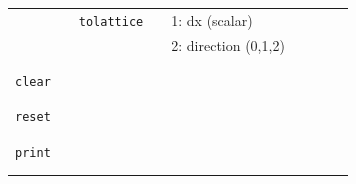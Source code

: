 \documentclass[11pt]{article}
\begin{document}
\begin{center}
\begin{tabular}{cclclclll}
    $\mbox{}$   && \verb!tolattice! && 1: dx (scalar) && \\
    $\mbox{}$   &&             && 2: direction (0,1,2) && \\
                                   && && && \\
    \hline
                                   && && && \\
    \verb!clear! & & && && \\
                                   && && && \\
    \hline
                                   && && && \\
    \verb!reset! & & && && \\
                                   && && && \\
    \hline
                                   && && && \\
   \verb!print! & & && && \\
                                   && && && \\
    \hline
                                   && && && \\
 
  \end{tabular}

\end{center}
\end{document}
